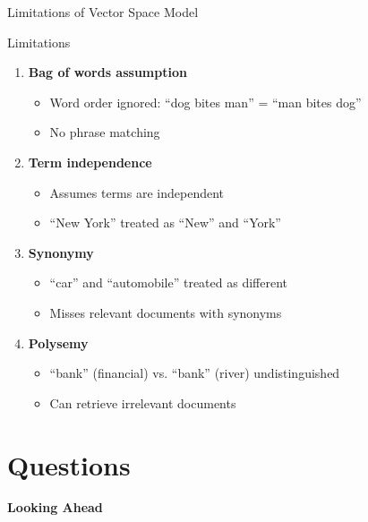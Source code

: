 \documentclass[aspectratio=169]{beamer}
\newif\ifanimated
\newcommand{\cpause}{\ifanimated\pause\fi}
\begin{document}
\begin{frame}[shrink=10]{Limitations of Vector Space Model}
\begin{alertblock}{ Limitations}
\begin{enumerate}
    \item \textbf{Bag of words assumption}
    \begin{itemize}
        \item Word order ignored: ``dog bites man'' = ``man bites dog''
        \item No phrase matching
    \end{itemize}
\cpause
    \item \textbf{Term independence}
    \begin{itemize}
        \item Assumes terms are independent
        \item ``New York'' treated as ``New'' and ``York''
    \end{itemize}
\cpause
    \item \textbf{Synonymy}
    \begin{itemize}
        \item ``car'' and ``automobile'' treated as different
        \item Misses relevant documents with synonyms
    \end{itemize}
\cpause
    \item \textbf{Polysemy}
    \begin{itemize}
        \item ``bank'' (financial) vs. ``bank'' (river) undistinguished
        \item Can retrieve irrelevant documents
    \end{itemize}

\end{enumerate}

\end{alertblock}

\end{frame}


\section{Questions}
\begin{frame}
  \centering
  \LARGE \textbf{Looking Ahead}
\end{frame}
\end{document}
